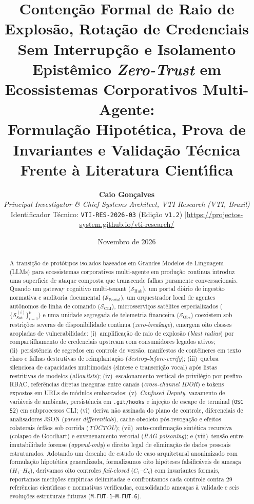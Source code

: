 \documentclass[10pt,twocolumn]{article}
\title{\Large\bfseries Conten\c{c}\~{a}o Formal de Raio de Explos\~{a}o, Rota\c{c}\~{a}o de Credenciais Sem Interrup\c{c}\~{a}o e Isolamento Epist\^{e}mico \emph{Zero-Trust} em Ecossistemas Corporativos Multi-Agente:\\[0.25em]
\large Formula\c{c}\~{a}o Hipot\'{e}tica, Prova de Invariantes e Valida\c{c}\~{a}o T\'{e}cnica Frente \`{a} Literatura Cient\'{\i}fica}
\author{%
  \textbf{Caio Gon\c{c}alves}\\
  \textit{Principal Investigator \& Chief Systems Architect, VTI Research (VTI, Brazil)}\\
  \small Identificador T\'{e}cnico: \texttt{VTI-RES-2026-03} (Edi\c{c}\~{a}o \texttt{v1.2}) \quad|\quad \url{https://projectos-system.github.io/vti-research/}
}
\date{Novembro de 2026}
\begin{document}
\nocite{R01,R02,R03,R04,R05,R06,R07,R08,R09,R10,R11,R12,R13,R14,R15,R16,R17,R18,R19,R20,R21,R22,R23,R24,R25,R26,R27,R28,R29}

\maketitle

\begin{abstract}
\noindent A transi\c{c}\~{a}o de prot\'{o}tipos isolados baseados em Grandes Modelos de Linguagem (LLMs) para ecossistemas corporativos multi-agente em produ\c{c}\~{a}o cont\'{\i}nua introduz uma superf\'{\i}cie de ataque composta que transcende falhas puramente conversacionais. Quando um gateway cognitivo multi-tenant ($\mathcal{S}_{\mathrm{Hub}}$), um portal di\'{a}rio de ingest\~{a}o normativa e auditoria documental ($\mathcal{S}_{\mathrm{Portal}}$), um orquestrador local de agentes aut\^{o}nomos de linha de comando ($\mathcal{S}_{\mathrm{CLI}}$), microsservi\c{c}os sat\'{e}lites especializados ($\{\mathcal{S}_{\mathrm{Sat}}^{(i)}\}_{i=1}^{k}$) e uma unidade segregada de telemetria financeira ($\mathcal{S}_{\mathrm{Obs}}$) coexistem sob restri\c{c}\~{o}es severas de disponibilidade cont\'{\i}nua (\emph{zero-breakage}), emergem oito classes acopladas de vulnerabilidade: (i)~amplifica\c{c}\~{a}o de raio de explos\~{a}o (\emph{blast radius}) por compartilhamento de credenciais upstream com consumidores legados ativos; (ii)~persist\^{e}ncia de segredos em controle de vers\~{a}o, manifestos de cont\^{e}ineres em texto claro e falhas destrutivas de reimplanta\c{c}\~{a}o (\emph{destroy-before-verify}); (iii)~quebra silenciosa de capacidades multimodais (s\'{\i}ntese e transcri\c{c}\~{a}o vocal) ap\'{o}s listas restritivas de modelos (\emph{allowlists}); (iv)~escalonamento vertical de privil\'{e}gio por prefixo RBAC, refer\^{e}ncias diretas inseguras entre canais (\emph{cross-channel IDOR}) e tokens expostos em URLs de m\'{o}dulos embarcados; (v)~\emph{Confused Deputy}, vazamento de vari\'{a}veis de ambiente, persist\^{e}ncia em \texttt{.git/hooks} e inje\c{c}\~{a}o de escape de terminal (\texttt{OSC 52}) em subprocessos CLI; (vi)~deriva n\~{a}o assinada do plano de controle, diferenciais de analisadores JSON (\emph{parser differentials}), cache obsoleto p\'{o}s-revoga\c{c}\~{a}o e efeitos colaterais \'{o}rf\~{a}os sob corrida (\emph{TOCTOU}); (vii)~auto-confirma\c{c}\~{a}o sint\'{e}tica recursiva (colapso de Goodhart) e envenenamento vetorial (\emph{RAG poisoning}); e (viii)~tens\~{a}o entre imutabilidade forense (\emph{append-only}) e direito legal de elimina\c{c}\~{a}o de dados pessoais estruturados. Adotando um desenho de estudo de caso arquitetural anonimizado com formula\c{c}\~{a}o hipot\'{e}tica generalizada, formalizamos oito hip\'{o}teses falsific\'{a}veis de amea\c{c}a ($H_1$--$H_8$), derivamos oito controles \emph{fail-closed} ($C_1$--$C_8$) com invariantes formais, reportamos medi\c{c}\~{o}es emp\'{\i}ricas delimitadas e confrontamos cada controle contra 29 refer\^{e}ncias cient\'{\i}ficas e normativas verificadas, consolidando amea\c{c}as \`{a} validade e seis evolu\c{c}\~{o}es estruturais futuras (\texttt{M-FUT-1}--\texttt{M-FUT-6}).


\end{abstract}
\end{document}
